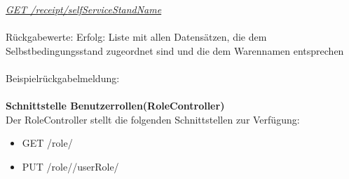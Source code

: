 \textit{\underline{GET /receipt/{selfServiceStandName}}}
\\                
\\
Rückgabewerte: \tab 					Erfolg: Liste mit allen Datensätzen, die dem Selbstbedingungsstand zugeordnet sind und die dem Warennamen entsprechen\\
\\
Beispielrückgabelmeldung:	
\\
\\
\textbf{Schnittstelle Benutzerrollen(RoleController)}
\\
Der RoleController stellt die folgenden Schnittstellen zur Verfügung:

\begin{itemize}
	\itemsep0pt
	\item  GET /role/
	\item PUT /role//userRole/
\end{itemize}


